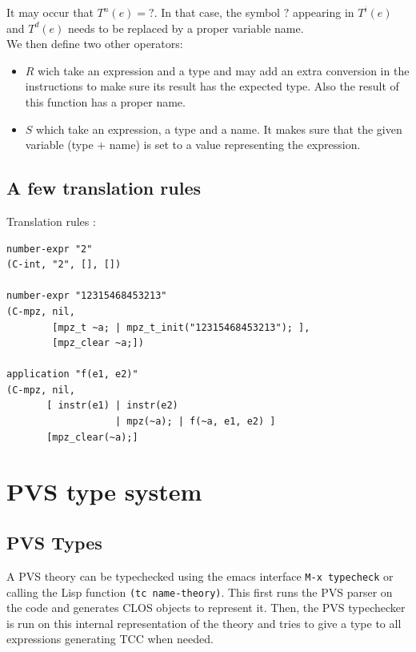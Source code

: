 \documentclass[12pt,a4paper,titlepage]{article}
\newcommand{\cl}[1]{\texttt{#1}}
\begin{document}
It may occur that $T^n(e) = ?$. In that case, the symbol $?$ appearing in $T^i(e)$ and $T^d(e)$ needs to be replaced by a proper variable name.\\

We then define two other operators:
\begin{itemize}
\item $R$ wich take an expression and a type and may add an extra conversion in the instructions to make sure its result has the expected type. Also the result of this function has a proper name.
\item $S$ which take an expression, a type and a name. It makes sure that the given variable (type + name) is set to a value representing the expression.
\end{itemize}




\subsection{A few translation rules}

Translation rules :




\begin{lstlisting}
number-expr "2"
(C-int, "2", [], [])

number-expr "12315468453213"
(C-mpz, nil,
        [mpz_t ~a; | mpz_t_init("12315468453213"); ],
        [mpz_clear ~a;])

application "f(e1, e2)"
(C-mpz, nil,
       [ instr(e1) | instr(e2)
                   | mpz(~a); | f(~a, e1, e2) ]
       [mpz_clear(~a);]
\end{lstlisting}



\section{PVS type system}

\subsection{PVS Types}
A PVS theory can be typechecked using the emacs interface \cl{M-x typecheck} or calling the Lisp function \cl{(tc name-theory)}. This first runs the PVS parser on the code and generates CLOS objects to represent it. Then, the PVS typechecker is run on this internal representation of the theory and tries to give a type to all expressions generating TCC when needed.\\
\end{document}
